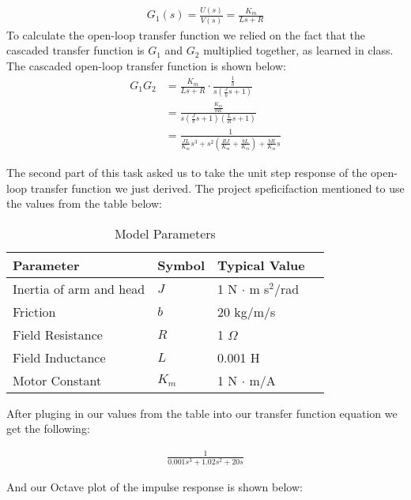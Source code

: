 \documentclass{article}
\begin{document}
	\begin{align*}
		G_1(s) = \frac{U(s)}{V(s)} = \frac{K_m}{Ls + R} 
	\end{align*}
	To calculate the open-loop transfer function we relied on the fact that
	the cascaded transfer function is $G_1$ and $G_2$ multiplied together, as
	learned in class. The cascaded open-loop transfer function is shown below:
	\begin{align*}
		G_1G_2 &= \frac{K_m}{Ls+R} \cdot \frac{\frac{1}{b}}{s(\frac{J}{b}s + 1)} \\
			   &= \frac{\frac{K_m}{bR}}{s\left(\frac{J}{b}s + 1\right)
			   \left(\frac{L}{R}s + 1\right)} \\
			   &= \frac{1}{\frac{JL}{K_m}s^3 + s^2\left( \frac{RJ}{K_m} + 
			   \frac{bL}{K_m} \right) + \frac{bR}{K_m}s}
	\end{align*}

	The second part of this task asked us to take the unit step response of the 
	open-loop transfer function we just derived. The project speficifaction 
	mentioned to use the values from the table below:\\

	\begin{table}[H]
	\begin{center}
    \begin{tabular}{ | l | l | l | p{5cm} |}
    \hline
    Parameter & Symbol & Typical Value \\ \hline
    Inertia of arm and head & $J$ & 1 N $\cdot$ m s$^2$/rad \\ \hline 
    Friction & $b$ & 20 kg/m/s \\ \hline
    Field Resistance & $R$ & 1 $\Omega$ \\ \hline
	Field Inductance & $L$ & 0.001 H \\ \hline
	Motor Constant & $K_m$ & 1 N $\cdot$ m/A \\
    \hline
    \end{tabular}
	\end{center}
	\caption{Model Parameters}
	\end{table}

	After pluging in our values from the table into our transfer function 
	equation we get the following:

	\begin{align*}
		\frac{1}{0.001s^3 + 1.02 s^2 + 20s} 
	\end{align*}

	And our Octave plot of the impulse response is shown below: \\
	
\end{document}
